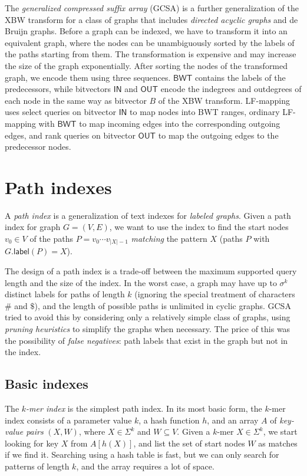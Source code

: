 \documentclass[a4paper,UKenglish]{lipics-v2016}
\newcommand{\abs}[1]{\ensuremath{\lvert #1 \rvert}}
\newcommand{\glabel}{\ensuremath{\mathsf{label}}}
\newcommand{\kmer}[1]{$#1$\nobreakdash-mer}
\newcommand{\LFmapping}{LF\nobreakdash-mapping}
\newcommand{\BWT}{\ensuremath{\mathsf{BWT}}}
\newcommand{\bvIN}{\ensuremath{\mathsf{IN}}}
\newcommand{\bvOUT}{\ensuremath{\mathsf{OUT}}}
\begin{document}
The \emph{generalized compressed suffix array} (GCSA) \cite{Siren2014} is a further generalization of the XBW transform for a class of graphs that includes \emph{directed acyclic graphs} and de Bruijn graphs. Before a graph can be indexed, we have to transform it into an equivalent graph, where the nodes can be unambiguously sorted by the labels of the paths starting from them. The transformation is expensive and may increase the size of the graph exponentially. After sorting the nodes of the transformed graph, we encode them using three sequences. $\BWT$ contains the labels of the predecessors, while bitvectors $\bvIN$ and $\bvOUT$ encode the indegrees and outdegrees of each node in the same way as bitvector $B$ of the XBW transform. \LFmapping{} uses select queries on bitvector $\bvIN$ to map nodes into BWT ranges, ordinary \LFmapping{} with $\BWT$ to map incoming edges into the corresponding outgoing edges, and rank queries on bitvector $\bvOUT$ to map the outgoing edges to the predecessor nodes.


\section{Path indexes}

A \emph{path index} is a generalization of text indexes for \emph{labeled graphs}. Given a path index for graph $G = (V, E)$, we want to use the index to find the start nodes $v_{0} \in V$ of the paths $P = v_{0} \dotsm v_{\abs{X}-1}$ \emph{matching} the pattern $X$ (paths $P$ with $G.\glabel(P) = X$).

The design of a path index is a trade-off between the maximum supported query length and the size of the index. In the worst case, a graph may have up to $\sigma^{k}$ distinct labels for paths of length $k$ (ignoring the special treatment of characters $\#$ and $\$$), and the length of possible paths is unlimited in cyclic graphs. GCSA \cite{Siren2014} tried to avoid this by considering only a relatively simple class of graphs, using \emph{pruning heuristics} to simplify the graphs when necessary. The price of this was the possibility of \emph{false negatives}: path labels that exist in the graph but not in the index.

\subsection{Basic indexes}

The \emph{\kmer{k} index} is the simplest path index. In its most basic form, the \kmer{k} index consists of a parameter value $k$, a hash function $h$, and an array $A$ of \emph{key-value pairs} $(X, W)$, where $X \in \Sigma^{k}$ and $W \subseteq V$. Given a \kmer{k} $X \in \Sigma^{k}$, we start looking for key $X$ from $A[h(X)]$, and list the set of start nodes $W$ as matches if we find it. Searching using a hash table is fast, but we can only search for patterns of length $k$, and the array requires a lot of space.
\end{document}
